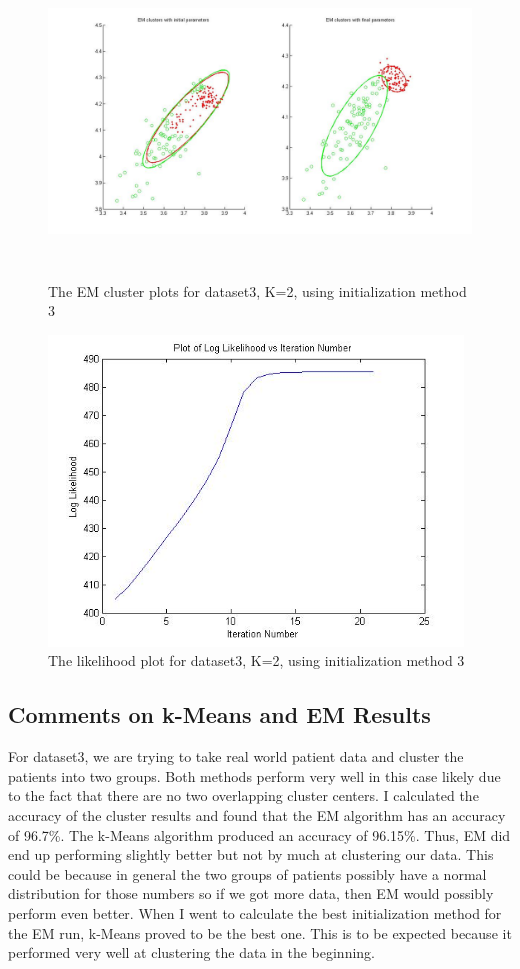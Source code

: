 \documentclass[11pt,psfig]{article}
\begin{document}
\begin{figure}[H]
\centering
\includegraphics[height=3.25in]{dataset3_EMclusterPlots.jpg}
\caption{The EM cluster plots for dataset3, K=2, using initialization method 3}
\end{figure}

\begin{figure}[H]
\centering
\includegraphics[height=3.25in]{dataset3_EMlogLikelihoodPlot.jpg}
\caption{The likelihood plot for dataset3, K=2, using initialization method 3}
\end{figure}

\subsection{Comments on k-Means and EM Results}

For dataset3, we are trying to take real world patient data and cluster the patients into two groups. Both methods perform very well in this case likely due to the fact that there are no two overlapping cluster centers. I calculated the accuracy of the cluster results and found that the EM algorithm has an accuracy of 96.7\%. The k-Means algorithm produced an accuracy of 96.15\%. Thus, EM did end up performing slightly better but not by much at clustering our data. This could be because in general the two groups of patients possibly have a normal distribution for those numbers so if we got more data, then EM would possibly perform even better. When I went to calculate the best initialization method for the EM run, k-Means proved to be the best one. This is to be expected because it performed very well at clustering the data in the beginning. 
\end{document}
